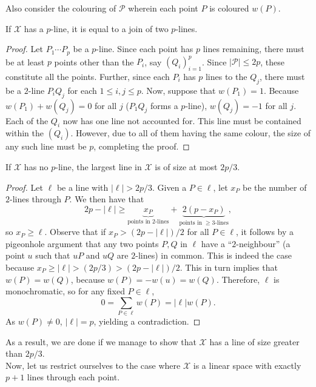 \documentclass{article}
\begin{document}
		Also consider the colouring of $\mathcal{P}$ wherein each point $P$ is coloured $w(P)$.

		\begin{prop}
			If $\mathcal{X}$ has a $p$-line, it is equal to a join of two $p$-lines.
		\end{prop}
		\begin{proof}
			Let $P_1\cdots P_p$ be a $p$-line. Since each point has $p$ lines remaining, there must be at least $p$ points other than the $P_i$, say $(Q_i)_{i=1}^p$. Since $|\mathcal{P}| \le 2p$, these constitute all the points. Further, since each $P_i$ has $p$ lines to the $Q_j$, there must be a $2$-line $P_iQ_j$ for each $1\le i,j \le p$. Now, suppose that $w(P_1) = 1$. Because $w(P_1) + w(Q_j) = 0$ for all $j$ ($P_1 Q_j$ forms a $p$-line), $w(Q_j) = -1$ for all $j$. Each of the $Q_i$ now has one line not accounted for. This line must be contained within the $(Q_i)$. However, due to all of them having the same colour, the size of any such line must be $p$, completing the proof.
		\end{proof}

		\begin{prop}
			If $\mathcal{X}$ has no $p$-line, the largest line in $\mathcal{X}$ is of size at most $2p/3$.
		\end{prop}
		\begin{proof}
			Let $\ell$ be a line with $|\ell| > 2p/3$. Given a $P \in \ell$, let $x_P$ be the number of $2$-lines through $P$. We then have that
			\[ 2p-|\ell| \ge \underbrace{x_P}_{\text{points in $2$-lines}} + \underbrace{2(p-x_P)}_{\text{points in $\ge 3$-lines}}, \]
			so $x_P \ge \ell$. Observe that if $x_P > (2p-|\ell|)/2$ for all $P \in \ell$, it follows by a pigeonhole argument that any two points $P,Q$ in $\ell$ have a ``$2$-neighbour'' (a point $u$ such that $uP$ and $uQ$ are $2$-lines) in common. This is indeed the case because $x_P \ge |\ell| > (2p/3) > (2p-|\ell|)/2$. This in turn implies that $w(P) = w(Q)$, because $w(P) = -w(u) = w(Q)$. Therefore, $\ell$ is monochromatic, so for any fixed $P \in \ell$,
			\[ 0 = \sum_{P \in \ell} w(P) = |\ell| w(P). \]
			As $w(P) \ne 0$, $|\ell| = p$, yielding a contradiction.
		\end{proof}		

		As a result, we are done if we manage to show that $\mathcal{X}$ has a line of size greater than $2p/3$.\\

		Now, let us restrict ourselves to the case where $\mathcal{X}$ is a linear space with exactly $p+1$ lines through each point.
\end{document}
